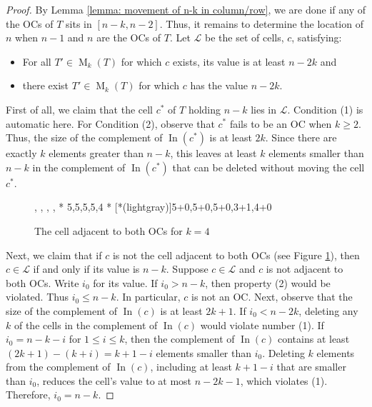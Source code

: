 \documentclass[12pt]{amsart}
\theoremstyle{definition}
\theoremstyle{remark}
\numberwithin{equation}{section}
\numberwithin{figure}{section}
\newcommand{\M}{\operatorname{M}}
\newcommand{\In}{\operatorname{In}}
\begin{document}
\begin{proof}
    By Lemma \ref{lemma: movement of n-k in column/row}, we are done if any of the OCs of $T$ sits in $[n-k,n-2]$.
    Thus, it remains to determine the location of $n$ when $n-1$ and $n$ are the OCs of $T$. Let $\mathcal{L}$ be the set of cells, $c$, satisfying:
    \begin{itemize}
    \item[$(1)$] For all $T'\in\M_k(T)$ for which $c$ exists, its value is at least $n-2k$
    and
    \item[$(2)$] there exist $T'\in\M_k(T)$ for which $c$ has the value $n-2k$.
    \end{itemize}

    First of all, we claim that the cell $c^*$ of $T$ holding $n-k$ lies in $\mathcal{L}$. Condition (1) is automatic here.
    For Condition (2), observe that $c^*$ fails to be an OC when $k\ge 2$. Thus, the size of the complement of $\In(c^*)$ is at least $2k$. Since there are exactly $k$ elements greater than $n-k$, this leaves at least $k$ elements smaller than $n-k$ in the complement of $\In(c^*)$ that can be deleted without moving the cell $c^*$.

        \begin{figure}[H]
    \ytableaushort
        {\none, \none, \none, \none, \none}
        * {5,5,5,5,4}
        * [*(lightgray)]{5+0,5+0,5+0,3+1,4+0}
    \caption{The cell adjacent to both OCs for $k=4$}
    \label{figure: critical cell}
    \end{figure}

    Next, we claim that if $c$ is not the cell adjacent to both OCs (see Figure \ref{figure: critical cell}), then $c \in \mathcal{L}$ if and only if its value is $n-k$. Suppose $c \in \mathcal{L}$ and $c$ is not adjacent to both OCs. Write $i_0$ for its value.
    If $i_0 > n-k$, then property (2) would be violated. Thus $i_0 \le n-k$. In particular, $c$ is not an OC.
    Next, observe that the size of the complement of $\In(c)$ is at least $2k+1$.
    If $i_0 < n-2k$, deleting any $k$ of the cells in the complement of $\In(c)$ would violate number (1).
    If $i_0 = n-k-i$ for $1\leq i \leq k$, then the complement of $\In(c)$ contains at least $(2k+1)-(k+i) = k + 1 - i$ elements smaller than $i_0$. Deleting $k$ elements from the complement of $\In(c)$, including at least $k+1-i$ that are smaller than $i_0$, reduces the cell's value to at most $n-2k-1$, which violates (1). Therefore, $i_0 = n - k$.


\end{proof}
\end{document}
